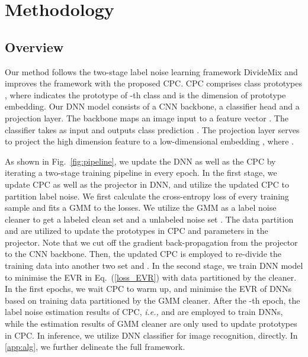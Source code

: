 \documentclass{article} \usepackage{iclr2023_conference,times}
\begin{document}
\section{Methodology}


\subsection{Overview} \label{overview}
Our method follows the two-stage label noise learning framework DivideMix \citep{Li2020DivideMixLW} and improves the framework with the proposed CPC. CPC comprises class prototypes , where  indicates the prototype of -th class and  is the dimension of prototype embedding.
Our DNN model consists of a CNN backbone, a classifier head and a projection layer. The backbone maps an image input  to a feature vector . The classifier takes  as input and outputs class prediction . The projection layer serves to project the high dimension feature  to a low-dimensional embedding , where . 

As shown in Fig.~\ref{fig:pipeline}, we update the DNN as well as the CPC by iterating a two-stage training pipeline in every epoch. In the first stage, we update CPC as well as the projector in DNN, and utilize the updated CPC to partition label noise. We first calculate the cross-entropy loss of every training sample and fits a GMM to the losses. We utilize the GMM as a label noise cleaner to get a labeled clean set  and a unlabeled noise set . The data partition  and  are utilized to update the prototypes in CPC and parameters in the projector. Note that we cut off the gradient back-propagation from the projector to the CNN backbone. Then, the updated CPC is employed to re-divide the training data into another two set  and . In the second stage, we train DNN model to minimise the EVR in Eq.~(\ref{loss_EVR}) with data partitioned by the cleaner. In the first  epochs, we wait CPC to warm up, and minimise the EVR of DNNs based on training data partitioned by the GMM cleaner. After the -th epoch, the label noise estimation results of CPC, \emph{i.e.,}  and  are employed to train DNNs, while the estimation results of GMM cleaner are only used to update prototypes in CPC. In inference, we utilize DNN classifier for image recognition, directly. In \ref{app:alg}, we further delineate the full framework.
\end{document}
